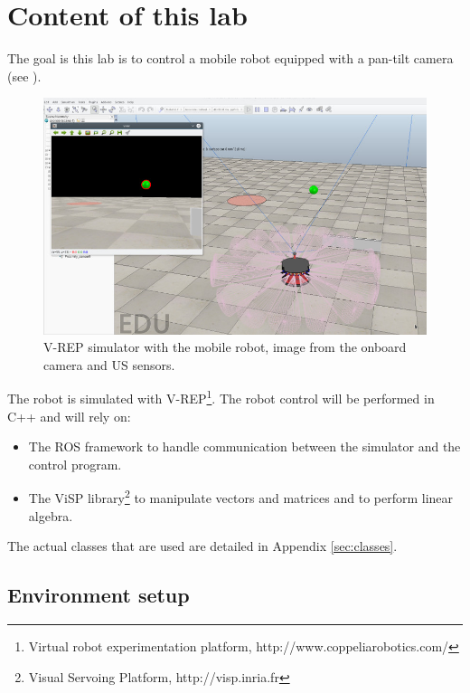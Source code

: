 \documentclass{ecnreport}
\begin{document}




\section{Content of this lab}

The goal is this lab is to control a mobile robot equipped with a pan-tilt camera 
 (see ).

\begin{figure}[h!]\centering
 \includegraphics[width=.8\linewidth]{vrep}
 \caption{V-REP simulator with the mobile robot, image from the onboard camera and US sensors.}
 \label{fig:vrep}
\end{figure}

The robot is simulated with V-REP\footnote{Virtual robot experimentation platform, http://www.coppeliarobotics.com/}.
The robot control will be performed in C++ and will rely on:

\begin{itemize}
 \item The ROS framework to handle communication between the simulator and the control program.
 \item The ViSP library\footnote{Visual Servoing Platform, http://visp.inria.fr} to manipulate vectors and matrices and to perform linear algebra.
\end{itemize}
The actual classes that are used are detailed in Appendix \ref{sec:classes}.\\

\subsection{Environment setup}
\end{document}
